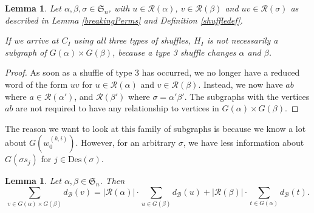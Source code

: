\documentclass[11pt,reqno]{amsart}
\newtheorem{lemma}[theorem]{Lemma}
\theoremstyle{definition}
\theoremstyle{notation}
\newcommand{\Des}{\text{Des}}
\newcommand{\calR}{\mathcal{R}}
\newcommand{\calB}{\mathcal{B}}
\begin{document}
\begin{lemma}\label{shufflelemma}
Let $\alpha, \beta, \sigma\in \mathfrak{S}_n$, with $u\in \calR(\alpha)$, $v\in \calR(\beta)$ and $uv\in \calR(\sigma)$ as described in Lemma \ref{breakingPerms} and Definition \ref{shuffledef}. 

If we arrive at $C_I$ using all three types of shuffles, $H_I$ is not necessarily a subgraph of $G(\alpha)\times G(\beta)$, because a type 3 shuffle changes $\alpha$ and $\beta$. 
\end{lemma}

\begin{proof}
    As soon as a shuffle of type 3 has occurred, we no longer have a reduced word of the form $uv$ for $u\in \calR(\alpha)$ and $v\in \calR(\beta)$. Instead, we now have $ab$ where $a\in \calR(\alpha')$, and $\calR(\beta')$ where $\sigma = \alpha'\beta'$. The subgraphs with the vertices $ab$ are not required to have any relationship to vertices in $G(\alpha)\times G(\beta)$.
\end{proof}

The reason we want to look at this family of subgraphs is because we know a lot about $G(w_0^{(k,i)})$. However, for an arbitrary $\sigma$, we have less information about $G(\sigma s_j)$ for $j\in \Des(\sigma)$. 

\begin{lemma}\label{fullycombraid}
Let $\alpha, \beta \in \mathfrak{S}_n$. Then
\[
\sum_{v\in G(\alpha) \times G(\beta)}d_\calB(v) = |\calR(\alpha)|\cdot \sum_{u\in G(\beta) }d_\calB(u) + |\calR(\beta)|\cdot \sum_{t\in G(\alpha) }d_\calB(t) .
\]
\end{lemma}
\end{document}
